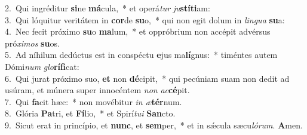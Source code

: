 {2.~}Qui ingréditur \textbf{si}ne \textbf{má}cula,~* et operá\textit{tur} \textit{ju}\textbf{stí}\textbf{ti}am:\\
{3.~}Qui lóquitur veritátem in \textbf{cor}de \textbf{su}o,~* qui non egit dolum in \textit{lin}\textit{gua} \textbf{su}a:\\
{4.~}Nec fecit próximo \textbf{su}o \textbf{ma}lum,~* et oppróbrium non accépit advérsus pró\textit{xi}\textit{mos} \textbf{su}os.\\
{5.~}Ad níhilum dedúctus est in conspéctu \textbf{e}jus ma\textbf{lí}gnus:~* timéntes autem Dómi\textit{num} \textit{glo}\textbf{rí}\textbf{fi}cat:\\
{6.~}Qui jurat próximo suo, \textbf{et} non \textbf{dé}cipit,~* qui pecúniam suam non dedit ad usúram, et múnera super innocéntem \textit{non} \textit{ac}\textbf{cé}pit.\\
{7.~}Qui \textbf{fa}cit hæc:~* non movébitur \textit{in} \textit{æ}\textbf{tér}num.\\
{8.~}Glória \textbf{Pa}tri, et \textbf{Fí}lio,~* et Spirí\textit{tu}\textit{i} \textbf{San}cto.\\
{9.~}Sicut erat in princípio, et \textbf{nunc}, et \textbf{sem}per,~* et in sǽcula sæcu\textit{ló}\textit{rum}. \textbf{A}men.\\
